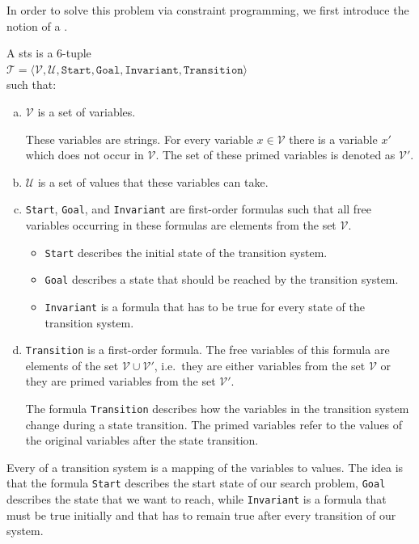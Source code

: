 In order to solve this problem via constraint programming, we first introduce the notion of a
.

\begin{Definition}
  A \Gls{sts} is a 6-tuple
  \\[0.2cm]
  \hspace*{1.3cm}
  $\mathcal{T} = \langle \mathcal{V}, \mathcal{U}, \mathtt{Start}, \mathtt{Goal}, \mathtt{Invariant}, \mathtt{Transition} \rangle$
  \\[0.2cm]
  such that:
  \begin{enumerate}[(a)]
  \item $\mathcal{V}$ is a set of variables.

        These variables are strings.  For every variable $x \in \mathcal{V}$ there is a 
        variable $x'$ which does not occur in $\mathcal{V}$.  The set of these primed variables is denoted as
        $\mathcal{V}'$.
  \item $\mathcal{U}$ is a set of values that these variables can take.
  \item \texttt{Start}, \texttt{Goal}, and \texttt{Invariant} are first-order formulas such that all free
         variables occurring in these formulas are elements from the set $\mathcal{V}$.
         \begin{itemize}
         \item \texttt{Start} describes the initial state of the transition system.
         \item \texttt{Goal} describes a state that should be reached by the transition system.
         \item \texttt{Invariant} is a formula that has to be true for every state of the transition system.
         \end{itemize}
  \item \texttt{Transition} is a first-order formula.  The free variables of this formula are elements of
        the set $\mathcal{V} \cup \mathcal{V}'$, i.e.~they are either variables from the set $\mathcal{V}$
        or they are primed variables from the set $\mathcal{V}'$.

        The formula \texttt{Transition} describes how the variables in the transition system change during a
        state transition.  The primed variables refer to the values of the original variables after the
        state transition.  \eox
  \end{enumerate}
\end{Definition}
Every  of a transition system is a mapping of the variables to values.
The idea is that the formula \texttt{Start} describes the start state of our search problem, \texttt{Goal}
describes the state that we want to reach, while \texttt{Invariant} is a formula that must be true initially
and that has to remain true after every transition of our system.

